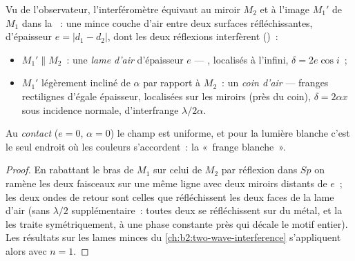 \begin{proposition}\label{prop:b2:michelson:equivalent}
Vu de l'observateur, l'interféromètre équivaut au miroir
$M_2$ et à l'image $M_1'$ de $M_1$ dans la ~: une mince couche d'air
entre deux surfaces réfléchissantes, d'épaisseur $e = |d_1 - d_2|$, dont les
deux réflexions interfèrent ()~:
\begin{itemize}
  \item $M_1' \parallel M_2$~: une \emph{lame d'air} d'épaisseur $e$ --- , localisés à l'infini, $\delta = 2e\cos i$~;
  \item $M_1'$ légèrement incliné de $\alpha$ par rapport à $M_2$~: un \emph{coin d'air}
        --- franges rectilignes d'égale épaisseur, localisées sur les
        miroirs (près du coin), $\delta = 2\alpha x$ sous incidence normale,
        d'interfrange $\lambda/2\alpha$.
\end{itemize}
Au \emph{contact} ($e = 0$, $\alpha = 0$) le champ est uniforme, et pour la lumière
blanche c'est le seul endroit où les couleurs s'accordent~: la «~frange blanche~».
\end{proposition}

\begin{proof}
En rabattant le bras de $M_1$ sur celui de $M_2$ par réflexion dans $Sp$ on ramène les
deux faisceaux sur une même ligne avec deux miroirs distants de $e$~; les deux ondes
de retour sont celles que réfléchissent les deux faces de la lame d'air (sans
$\lambda/2$ supplémentaire~: toutes deux se réfléchissent sur du métal, et la  les traite
symétriquement, à une phase constante près qui décale le motif entier).
Les résultats sur les lames minces du \cref{ch:b2:two-wave-interference} s'appliquent alors
avec $n = 1$.
\end{proof}

